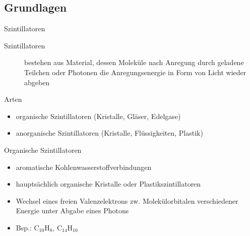 \subsection[]{Grundlagen}

\begin{frame}{Szintillatoren}

\begin{description}
	  \item[Szintillatoren] bestehen aus Material, dessen Moleküle nach Anregung durch geladene
	  Teilchen oder Photonen die Anregungsenergie in Form von Licht wieder abgeben
	\end{description}
	\begin{block}{Arten}
		\begin{itemize}
		  \item organische Szintillatoren (Kristalle, Gläser, Edelgase)
		  \item anorganische Szintillatoren (Kristalle, Flüssigkeiten, Plastik)
		\end{itemize}
	\end{block}
	\begin{block}{Organische Szintillatoren}
		\begin{itemize}
		  \item aromatische Kohlenwasserstoffverbindungen
		  \item hauptsächlich organische Kristalle oder Plastikszintillatoren
		  \item Wechsel eines freien Valenzelektrons zw.
Molekülorbitalen verschiedener Energie unter Abgabe eines Photons
		  \item Bsp.: C$_{10}$H$_8$, C$_{14}$H$_{10}$
		\end{itemize}
	\end{block}
\end{frame}	


